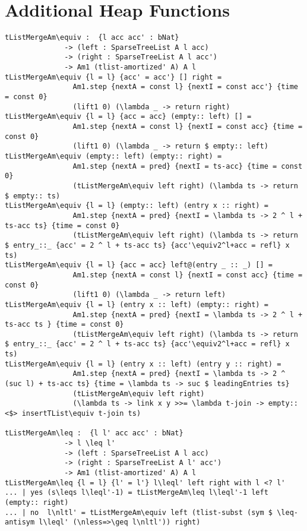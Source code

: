 \newpage
\section{Additional Heap Functions}
\label{sec:heap-additional}
\begin{lstlisting}[caption={Merging heaps},label={lst:appendix:heap:merge}]
tListMergeAm\equiv :  {l acc acc' : bNat}
              -> (left : SparseTreeList A l acc)
              -> (right : SparseTreeList A l acc')
              -> Am1 (tlist-amortized' A) A l
tListMergeAm\equiv {l = l} {acc' = acc'} [] right =
                Am1.step {nextA = const l} {nextI = const acc'} {time = const 0}
                (lift1 0) (\lambda _ -> return right)
tListMergeAm\equiv {l = l} {acc = acc} (empty:: left) [] =
                Am1.step {nextA = const l} {nextI = const acc} {time = const 0}
                (lift1 0) (\lambda _ -> return $ empty:: left)
tListMergeAm\equiv (empty:: left) (empty:: right) =
                Am1.step {nextA = pred} {nextI = ts-acc} {time = const 0}
                (tListMergeAm\equiv left right) (\lambda ts -> return $ empty:: ts)
tListMergeAm\equiv {l = l} (empty:: left) (entry x :: right) =
                Am1.step {nextA = pred} {nextI = \lambda ts -> 2 ^ l + ts-acc ts} {time = const 0}
                (tListMergeAm\equiv left right) (\lambda ts -> return $ entry_::_ {acc' = 2 ^ l + ts-acc ts} {acc'\equiv2^l+acc = refl} x ts)
tListMergeAm\equiv {l = l} {acc = acc} left@(entry _ :: _) [] =
                Am1.step {nextA = const l} {nextI = const acc} {time = const 0}
                (lift1 0) (\lambda _ -> return left)
tListMergeAm\equiv {l = l} (entry x :: left) (empty:: right) =
                Am1.step {nextA = pred} {nextI = \lambda ts -> 2 ^ l + ts-acc ts } {time = const 0}
                (tListMergeAm\equiv left right) (\lambda ts -> return $ entry_::_ {acc' = 2 ^ l + ts-acc ts} {acc'\equiv2^l+acc = refl} x ts)
tListMergeAm\equiv {l = l} (entry x :: left) (entry y :: right) =
                Am1.step {nextA = pred} {nextI = \lambda ts -> 2 ^ (suc l) + ts-acc ts} {time = \lambda ts -> suc $ leadingEntries ts}
                (tListMergeAm\equiv left right)
                (\lambda ts -> link x y >>= \lambda t-join -> empty:: <$> insertTList\equiv t-join ts)

tListMergeAm\leq :  {l l' acc acc' : bNat}
              -> l \leq l'
              -> (left : SparseTreeList A l acc)
              -> (right : SparseTreeList A l' acc')
              -> Am1 (tlist-amortized' A) A l
tListMergeAm\leq {l = l} {l' = l'} l\leql' left right with l <? l'
... | yes (s\leqs l\leql'-1) = tListMergeAm\leq l\leql'-1 left (empty:: right)
... | no  l\nltl' = tListMergeAm\equiv left (tlist-subst (sym $ \leq-antisym l\leql' (\nless=>\geq l\nltl')) right)


\end{lstlisting}
